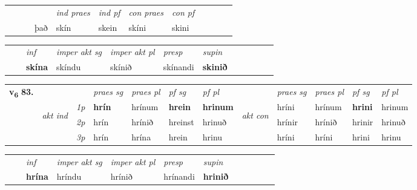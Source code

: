 \begin{tabular}{llllllllllll}
 & &  & &  \textit{ind praes} & \textit{ind pf} & \textit{con praes} & \textit{con pf} \\*
&  & & það & skín & skein & skíni & skini \\*
\cmidrule{5-9}
\end{tabular}


\begin{tabular}{llllllllllll}
 & & \textit{inf} & \textit{imper akt sg} & \textit{imper akt pl}   & \textit{presp} & \textit{supin}       \\*
  & & \textbf{skína} & skíndu  & skínið   & skínandi &  \textbf{skinið}   \\*
\cmidrule{1-12}
\end{tabular}



\begin{tabular}{llllllllllll} \toprule
\multirow{4}{*}{{{\textbf{v{\textsubscript{6}}} \Large{\textbf{83.}}}}}  & &   &  \textit{praes sg}  & \textit{praes pl}  &\textit{ pf sg} & \textit{pf pl} &  &  \textit{praes sg}  & \textit{praes pl}  & \textit{pf sg} & \textit{pf pl } \\*
	\cmidrule{4-7} \cmidrule{9-12}
 & \multirow{3}{*}{\begin{turn}{90}\textit{akt ind}\end{turn}} & {\textit{1p}} & \textbf{hrín} & hrínum    & \textbf{hrein} & \textbf{hrinum} & \multirow{3}{*}{\begin{turn}{90}\textit{akt con}\end{turn}} &hríni & hrínum & \textbf{hrini} & hrinum\\*
& &  {\textit{2p}} &  hrín  & hrínið   & hreinst & hrinuð & & hrínir & hrínið & hrinir & hrinuð \\*
& &  {\textit{3p}} & hrín & hrína   & hrein & hrinu & & hríni & hríni& hrini & hrinu  \\*
\cmidrule{4-7} \cmidrule{9-12}
\end{tabular}


\begin{tabular}{llllllllllll}
 & & \textit{inf} & \textit{imper akt sg} & \textit{imper akt pl}   & \textit{presp} & \textit{supin}       \\*
  & & \textbf{hrína} & hríndu  & hrínið   & hrínandi &  \textbf{hrinið}   \\*
\cmidrule{1-12}
\end{tabular}



